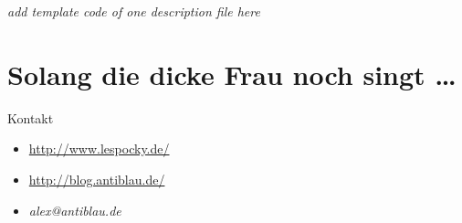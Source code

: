 \documentclass[hyperref={pdfpagelabels=false}]{beamer}
\begin{document}
\begin{frame}
    \emph{add template code of one description file here}
\end{frame}

\section*{Solang die dicke Frau noch singt \dots}

\begin{frame}{Kontakt}
    \begin{itemize}
        \item \url{http://www.lespocky.de/}
        \item \url{http://blog.antiblau.de/}
        \item \emph{alex@antiblau.de}
    \end{itemize}
\end{frame}
\end{document}

